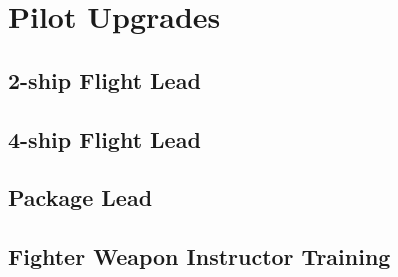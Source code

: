 \part{Pilot Upgrades}
  \chapter{2-ship Flight Lead}
  \chapter{4-ship Flight Lead}
  \chapter{Package Lead}
  \chapter{Fighter Weapon Instructor Training}